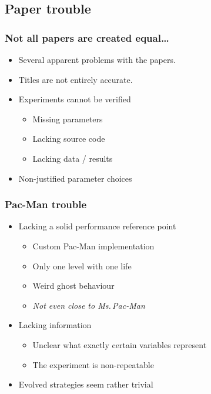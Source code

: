 \documentclass{beamer}
\begin{document}
\subsection{Paper trouble}
\begin{frame}
\frametitle{Not all papers are created equal\dots}
\begin{itemize}
\item Several apparent problems with the papers.
\item Titles are not entirely accurate.
\item Experiments cannot be verified
\begin{itemize}
\item Missing parameters
\item Lacking source code
\item Lacking data / results
\end{itemize}
\item Non-justified parameter choices
\end{itemize}
\end{frame}

\begin{frame}
\frametitle{Pac-Man trouble}
\begin{itemize}
\item Lacking a solid performance reference point
\begin{itemize}
\item Custom Pac-Man implementation
\item Only one level with one life
\item Weird ghost behaviour
\item \textit{Not even close to Ms.\,Pac-Man}
\end{itemize}
\item Lacking information
\begin{itemize}
	\item Unclear what exactly certain variables represent
	\item The experiment is non-repeatable
\end{itemize}
\item Evolved strategies seem rather trivial
\end{itemize}
\end{frame}
\end{document}
